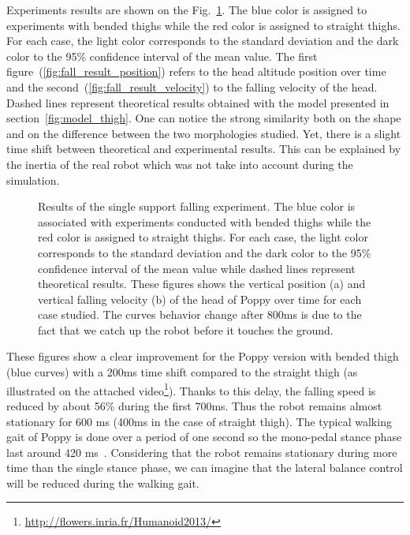 Experiments results are shown on the Fig.~\ref{fig:falling_results}.
The blue color is assigned to experiments with bended thighs while the red color is assigned to straight thighs.
For each case, the light color corresponds to the standard deviation and the dark color to the 95\% confidence interval of the mean value.
The first figure~(\ref{fig:fall_result_position}) refers to the head altitude position over time
and the second~(\ref{fig:fall_result_velocity}) to the falling velocity of the head.
Dashed lines represent theoretical results obtained with the model presented in section~\ref{fig:model_thigh}.
One can notice the strong similarity both on the shape and on the difference between the two morphologies studied.
Yet, there is a slight time shift between theoretical and experimental results.
This can be explained by the inertia of the real robot which was not take into account during the simulation.

\begin{figure}[h]
\centering
    \hfil
    \caption{Results of the single support falling experiment.
    The blue color is associated with experiments conducted with bended thighs while the red color is assigned to straight thighs.
    For each case, the light color corresponds to the standard deviation and the dark color to the 95\% confidence interval of the mean value while dashed lines represent theoretical results.
    These figures shows the vertical position (a) and vertical falling velocity (b) of the head of Poppy over time for each case studied.
    The curves behavior change after 800ms is due to the fact that we catch up the robot before it touches the ground.}
    \label{fig:falling_results}
\end{figure}

These figures show a clear improvement for the Poppy version with bended thigh (blue curves) with a 200ms time shift compared to the straight thigh (as illustrated on the attached video\footnote{\url{http://flowers.inria.fr/Humanoid2013/}\label{video}}).
Thanks to this delay, the falling speed is reduced by about 56\% during the first 700ms.
Thus the robot remains almost stationary for 600 ms (400ms in the case of straight thigh).
The typical walking gait of Poppy is done over a period of one second so the mono-pedal stance phase last around 420 ms~\cite{lapeyre2013poppy}.
Considering that the robot remains stationary during more time than the single stance phase, we can imagine that the lateral balance control will be reduced during the walking gait.

